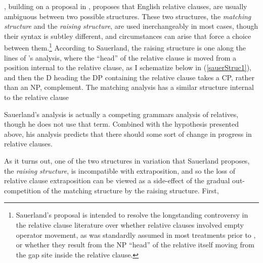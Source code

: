\citet{sauerland2003}, building on a proposal in \citet{carlson1977}, proposes that English relative clauses, are usually ambiguous between two possible structures. These two structures, the \textsl{matching structure} and the \textsl{raising structure}, are used inerchangeably in most cases, though their syntax is subtley different, and circumstances can arise that force a choice between them.\footnote{Sauerland's proposal is intended to resolve the longstanding controversy in the relative clause literature over whether relative clauses involved empty operator movement, as was standardly assumed in most treatments prior to \citet{kayne1994}, or whether they result from the NP ``head'' of the relative itself moving from the gap site inside the relative clause.} According to Sauerland, the raising structure is one along the lines of \citet{kayne1994}'s analysis, where the ``head'' of the relative clause is moved from a position internal to the relative clause, as I schematize below in (\ref{sauerStruc1}), and then the D heading the DP containing the relative clause takes a CP, rather than an NP, complement. The matching analysis has a similar structure internal to the relative clause


\noindent Sauerland's analysis is actually a competing grammars analysis of relatives, though he does not use that term. Combined with the hypothesis presented above, his analysis predicts that there should some sort of change in progress in relative clauses.

As it turns out, one of the two structures in variation that Sauerland proposes, the \textsl{raising structure}, is incompatible with extraposition, and so the loss of relative clause extraposition can be viewed as a side-effect of the gradual out-competition of the matching structure by the raising structure. First, \citet{baltin2006}

